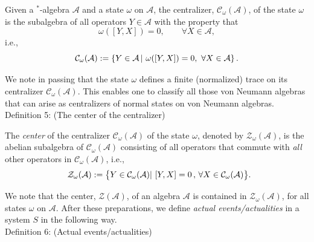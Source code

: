 \documentclass[12pt]{article}
\begin{document}
Given a $^{*}$-algebra $\mathcal{A}$ and a state $\omega$ on $\mathcal{A}$, the centralizer,
$\mathcal{C}_{\omega}(\mathcal{A})$, of the state $\omega$ is the subalgebra of all operators $Y \in \mathcal{A}$
with the property that
$$\omega([Y, X]) =0, \qquad \forall X \in \mathcal{A},$$
i.e.,
$$\hspace{2.8cm}\mathcal{C}_{\omega}(\mathcal{A}):=\left\{Y\in \mathcal{A}\, \vert \,\,\omega([Y, X]) =0, \,\,\forall X \in \mathcal{A}\right\} .
\hspace{2.8cm} \square$$

We note in passing that the state $\omega$ defines a finite (normalized) trace on its centralizer
$\mathcal{C}_{\omega}(\mathcal{A})$. This enables one to classify all those von Neumann algebras that can arise as
centralizers of normal states on von Neumann algebras.\\

{Definition 5}: (The center of the centralizer)

The \textit{center} of the centralizer $\mathcal{C}_{\omega}(\mathcal{A})$ of the state $\omega$, denoted by
$\mathcal{Z}_{\omega}(\mathcal{A})$, is the abelian subalgebra of $\mathcal{C}_{\omega}(\mathcal{A})$ consisting
of all operators that commute with \textit{all} other operators in
$\mathcal{C}_{\omega}(\mathcal{A})$, i.e.,
$$
\hspace{2.5cm}\mathcal{Z}_{\omega}(\mathcal{A}):= \big\{ Y \in \mathcal{C}_{\omega}(\mathcal{A})| \,\,[Y,X]=0\,,\, \forall X \in
\mathcal{C}_{\omega}(\mathcal{A}) \big\}. \hspace{2.3cm} \square
$$

 We note that the center, $\mathcal{Z}(\mathcal{A})$, of an algebra $\mathcal{A}$ is contained in
 $\mathcal{Z}_{\omega}(\mathcal{A})$, for all states $\omega$ on $\mathcal{A}$. After these preparations,
 we define \textit{actual events/actualities} in a system $S$ in the following way.\\

 {Definition 6}: (Actual events/actualities) \label{ETHevent}
\end{document}
